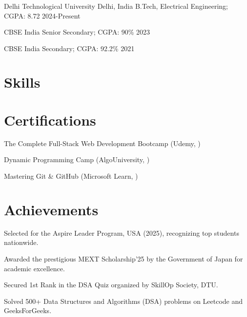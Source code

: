 \documentclass[a4paper,10pt]{article}
\begin{document}
\resumeSubheading
{Delhi Technological University}
{Delhi, India}
{B.Tech, Electrical Engineering; CGPA: 8.72}
{2024-Present}


\resumeSubheading
{CBSE}
{India}
{Senior Secondary; CGPA: 90\%}
{2023}


\resumeSubheading
{CBSE}
{India}
{Secondary; CGPA: 92.2\%}
{2021}


\section{Skills}




\section{Certifications}

\item The Complete Full-Stack Web Development Bootcamp (Udemy, )
\item Dynamic Programming Camp (AlgoUniversity, )
\item Mastering Git \& GitHub (Microsoft Learn, )

\section{Achievements}

\item Selected for the Aspire Leader Program, USA (2025), recognizing top students nationwide.
\item Awarded the prestigious MEXT Scholarship’25 by the Government of Japan for academic excellence.
\item Secured 1st Rank in the DSA Quiz organized by SkillOp Society, DTU.
\item Solved 500+ Data Structures and Algorithms (DSA) problems on Leetcode and GeeksForGeeks.
\end{document}
